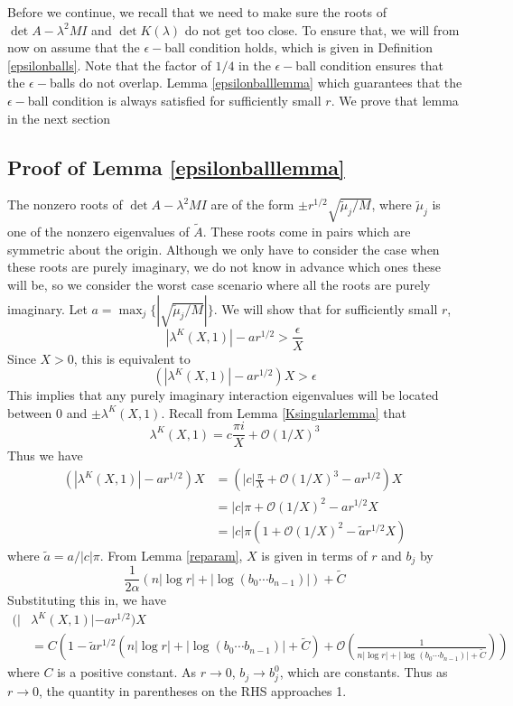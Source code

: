 \documentclass[thesis.tex]{subfiles}
\begin{document}
Before we continue, we recall that we need to make sure the roots of $\det A - \lambda^2 M I$ and $\det K(\lambda)$ do not get too close. To ensure that, we will from now on assume that the $\epsilon-$ball condition holds, which is given in Definition \ref{epsilonballs}. Note that the factor of $1/4$ in the $\epsilon-$ball condition ensures that the $\epsilon-$balls do not overlap. Lemma \ref{epsilonballlemma} which guarantees that the $\epsilon-$ball condition is always satisfied for sufficiently small $r$. We prove that lemma in the next section

\subsection{Proof of Lemma \ref{epsilonballlemma}}

The nonzero roots of $\det A - \lambda^2 M I$ are of the form $\pm r^{1/2} \sqrt{\tilde{\mu}_j/M}$, where $\tilde{\mu}_j$ is one of the nonzero eigenvalues of $\tilde{A}$. These roots come in pairs which are symmetric about the origin. Although we only have to consider the case when these roots are purely imaginary, we do not know in advance which ones these will be, so we consider the worst case scenario where all the roots are purely imaginary. Let $a = \max_j\{| \sqrt{\tilde{\mu}_j/M}|\}$. We will show that for sufficiently small $r$, 
\[
|\lambda^K(X,1)| - a r^{1/2} > \frac{\epsilon}{X}
\]
Since $X > 0$, this is equivalent to
\[
(|\lambda^K(X,1)| - a r^{1/2})X  > \epsilon
\]
This implies that any purely imaginary interaction eigenvalues will be located between 0 and $\pm \lambda^K(X,1)$. Recall from Lemma \ref{Ksingularlemma} that
\[
\lambda^K(X,1)
= c \frac{\pi i }{X} + \mathcal{O}(1/X)^3 
\]
Thus we have
\begin{align*}
(|\lambda^K(X,1)| - a r^{1/2})X &= \left( |c| \frac{\pi}{X} + \mathcal{O}(1/X)^3 - a r^{1/2} \right)X \\
&= |c| \pi + \mathcal{O}(1/X)^2 - a r^{1/2} X \\
&= |c| \pi \left(1 + \mathcal{O}(1/X)^2 - \tilde{a} r^{1/2} X\right)
\end{align*}
where $\tilde{a} = a / |c| \pi$. From Lemma \ref{reparam}, $X$ is given in terms of $r$ and $b_j$ by
\[
\frac{1}{2\alpha} (n |\log r| + |\log (b_0 \cdots b_{n-1})| ) + \tilde{C}
\]
Substituting this in, we have
\begin{align*}
(|&\lambda^K(X,1)| - a r^{1/2})X \\
&= C \left(1 - \tilde{a} r^{1/2}(n |\log r| + |\log (b_0 \cdots b_{n-1})| + \tilde{C}) + \mathcal{O}\left( \frac{1}{n |\log r| + |\log (b_0 \cdots b_{n-1})| + \tilde{C}} \right) \right)
\end{align*}
where $C$ is a positive constant. As $r \rightarrow 0$, $b_j \rightarrow b_j^0$, which are constants. Thus as $r \rightarrow 0$, the quantity in parentheses on the RHS approaches 1. 
\end{document}
